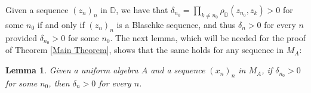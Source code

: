 \documentclass[preprint,12pt,number]{elsarticle}
\newtheorem{lemma}[theorem]{Lemma}
\newcommand{\D}{\mathbb{D}}
\begin{document}

Given a sequence $(z_n)_n$ in $\D$, we have that $\delta_{n_0}=\prod_{k\neq n_0}\rho_\D(z_{n_0},z_k)>0$ for some $n_0$ if and only if $(z_n)_n$ is a Blaschke sequence, and thus $\delta_n>0$ for every $n$ provided $\delta_{n_0}>0$ for some $n_0$. The next lemma, which will be needed for the proof of Theorem \ref{Main Theorem},  shows that the same holds for any sequence in $M_A$:

\begin{lemma}\label{lema-tec}
    Given a uniform algebra $A$ and a sequence $(x_n)_n$ in $M_A$, if $\delta_{n_0}>0$ for some $n_0$, then $\delta_n>0$ for every $n$.
\end{lemma}
\end{document}
